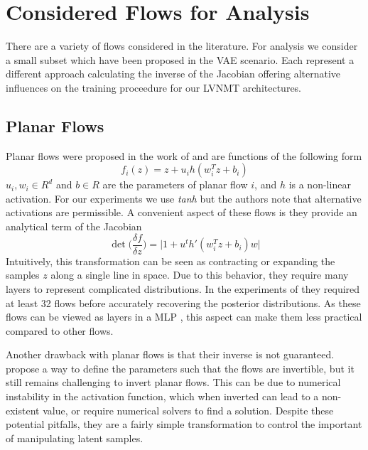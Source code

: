 \section{Considered Flows for Analysis}

There are a variety of flows considered in the literature. For analysis we consider a small subset which have been proposed in the \ac{VAE} scenario. Each represent a different approach calculating the inverse of the Jacobian offering alternative influences on the training proceedure for our \ac{LVNMT} architectures. 

\subsection{Planar Flows}

Planar flows were proposed in the work of \citet{rezende2015VIwithNF} and are functions of the following form
\begin{equation}
	f_{i}(z) = z + u_{i} h(w_{i}^{T} z + b_{i})
\end{equation}
$u_{i}, w_{i} \in R^{d}$ and $b \in R$ are the parameters of planar flow $i$, and $h$ is a non-linear activation. For our experiments we use \textit{tanh} but the authors note that alternative activations are permissible. A convenient aspect of these flows is they provide an analytical term of the Jacobian
\begin{equation}
	\det \bigg( \frac{\delta f}{\delta z} \bigg) = \bigg| 1 + u^{t} h'(w_{i}^{T} z + b_{i})w \bigg|
\end{equation} 
Intuitively, this transformation can be seen as contracting or expanding the samples $z$ along a single line in space.  Due to this behavior, they require many layers to represent complicated distributions. In the experiments of \citet{rezende2015VIwithNF} they required at least 32 flows before accurately recovering the posterior distributions. As these flows can be viewed as layers in a \ac{MLP} \cite{kingma2016IAF}, this aspect can make them less practical compared to other flows. 


Another drawback with planar flows is that their inverse is not guaranteed. \citet{rezende2015VIwithNF} propose a way to define the parameters such that the flows are invertible, but it still remains challenging to invert planar flows. This can be due to numerical instability in the activation function, which when inverted can lead to a non-existent value, or require numerical solvers to find a solution. Despite these potential pitfalls, they are a fairly simple transformation to control the important of manipulating latent samples. 




